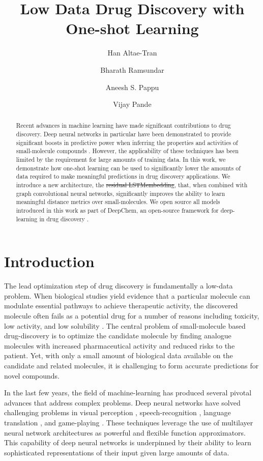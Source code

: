 \documentclass[journal=jacsat,manuscript=article]{achemso}
\author{Han Altae-Tran}
\affiliation{Department of Biological Engineering, Massachusetts Institute of Technology}
\author{Bharath Ramsundar}
\affiliation{Department of Computer Science, Stanford University}
\author{Aneesh S. Pappu}
\affiliation{Department of Computer Science, Stanford University}
\author{Vijay Pande}
\affiliation{Department of Chemistry, Stanford University}
\title{Low Data Drug Discovery with One-shot Learning}
\providecommand{\DIFaddtex}[1]{{\protect\color{blue}\uwave{#1}}} %
\providecommand{\DIFdeltex}[1]{{\protect\color{red}\sout{#1}}}                      %
\providecommand{\DIFaddbegin}{} %
\providecommand{\DIFaddend}{} %
\providecommand{\DIFdelbegin}{} %
\providecommand{\DIFdelend}{} %
\providecommand{\DIFadd}[1]{\texorpdfstring{\DIFaddtex{#1}}{#1}} %
\providecommand{\DIFdel}[1]{\texorpdfstring{\DIFdeltex{#1}}{}} %
\begin{document}
\maketitle

\begin{abstract}
Recent advances in machine learning have made significant contributions to drug discovery. Deep neural networks in particular have been demonstrated to provide significant boosts in predictive power when inferring the properties and activities of small-molecule compounds \cite{ma2015deep}. However, the applicability of these techniques has been limited by the requirement for large amounts of training data. In this work, we demonstrate how one-shot learning can be used to significantly lower the amounts of data required to make meaningful predictions in drug discovery applications. We introduce a new architecture, the \DIFdelbegin \DIFdel{residual LSTMembedding}\DIFdelend \DIFaddbegin \DIFadd{iterative refinement LSTM}\DIFaddend , that, when combined with graph convolutional neural networks, significantly improves the ability to learn meaningful distance metrics over small-molecules. We open source all models introduced in this work as part of DeepChem, an open-source framework for deep-learning in drug discovery
\cite{ram2016}.
\end{abstract}

\section{Introduction}
The lead optimization step of drug discovery is fundamentally a low-data problem. When biological studies yield evidence that a particular molecule can modulate essential pathways to achieve therapeutic activity, the discovered molecule often fails as a potential drug for a number of reasons including toxicity, low activity, and low solubility \cite{waring2015analysis}. The central problem of small-molecule based drug-discovery is to optimize the candidate molecule by finding analogue molecules with increased pharmaceutical activity and reduced risks to the patient. Yet, with only a small amount of biological data available on the candidate and related molecules, it is challenging to form accurate predictions for novel compounds.

In the last few years, the field of machine-learning has produced several pivotal advances that address complex problems. Deep neural networks have solved challenging problems in visual perception \cite{ILSVRC15}, speech-recognition \cite{deng2013new}, language translation \cite{wu2016google}, and game-playing \cite{silver2016mastering}. These techniques leverage the use of multilayer neural network architectures as powerful and flexible function approximators. This capability of deep neural networks is underpinned by their ability to learn sophisticated representations of their input given large amounts of data.
\end{document}

